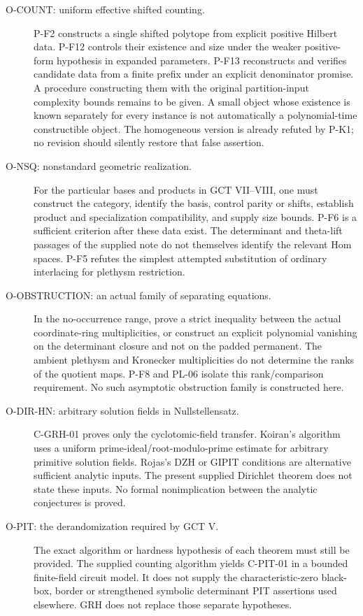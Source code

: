 \begin{description}
\item[O-COUNT: uniform effective shifted counting.]
P-F2 constructs a single shifted polytope from explicit positive Hilbert
data. P-F12 controls their existence and size under the weaker
positive-form hypothesis in expanded parameters. P-F13 reconstructs
and verifies candidate data from a finite prefix under an explicit
denominator promise. A procedure constructing them with the original
partition-input complexity bounds remains to be given. A small object
whose existence is known separately for every instance is not automatically
a polynomial-time constructible object. The homogeneous version is already
refuted by P-K1; no revision should silently restore that false assertion.

\item[O-NSQ: nonstandard geometric realization.]
For the particular bases and products in GCT VII--VIII, one must construct
the category, identify the basis, control parity or shifts, establish
product and specialization compatibility, and supply size bounds.
P-F6 is a sufficient criterion after these data exist. The determinant
and theta-lift passages of the supplied note do not themselves identify
the relevant Hom spaces. P-F5 refutes the simplest attempted substitution
of ordinary interlacing for plethysm restriction.

\item[O-OBSTRUCTION: an actual family of separating equations.]
In the no-occurrence range, prove a strict inequality between the actual
coordinate-ring multiplicities, or construct an explicit polynomial
vanishing on the determinant closure and not on the padded permanent.
The ambient plethysm and Kronecker multiplicities do not determine the
ranks of the quotient maps. P-F8 and PL-06 isolate this rank/comparison
requirement. No such asymptotic obstruction family is constructed here.

\item[O-DIR-HN: arbitrary solution fields in Nullstellensatz.]
C-GRH-01 proves only the cyclotomic-field transfer. Koiran's algorithm uses
a uniform prime-ideal/root-modulo-prime estimate for arbitrary primitive
solution fields. Rojas's DZH or GIPIT conditions are alternative sufficient
analytic inputs. The present supplied Dirichlet theorem does not state
these inputs. No formal nonimplication between the analytic conjectures
is proved.

\item[O-PIT: the derandomization required by GCT V.]
The exact algorithm or hardness hypothesis of each theorem must still be
provided. The supplied counting algorithm yields C-PIT-01 in a bounded
finite-field circuit model. It does not supply the characteristic-zero
black-box, border or strengthened symbolic determinant PIT assertions
used elsewhere. GRH does not replace those separate hypotheses.


\end{description}
